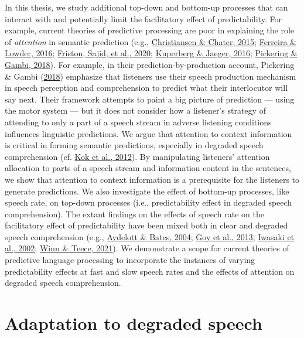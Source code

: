 \documentclass[a4paper, nobind]{templates/ociamthesis}
\begin{document}
In this thesis, we study additional top-down and bottom-up processes that can interact with and potentially limit the facilitatory effect of predictability.
For example, current theories of predictive processing are poor in explaining the role of \emph{attention} in semantic prediction (e.g., \protect\hyperlink{ref-Christiansen2015}{Christiansen \& Chater, 2015}; \protect\hyperlink{ref-Ferreira2016}{Ferreira \& Lowder, 2016}; \protect\hyperlink{ref-Friston2020b}{Friston, Sajid, et al., 2020}; \protect\hyperlink{ref-Kuperberg2016}{Kuperberg \& Jaeger, 2016}; \protect\hyperlink{ref-Pickering2018}{Pickering \& Gambi, 2018}).
For example, in their prediction-by-production account, Pickering \& Gambi (\protect\hyperlink{ref-Pickering2018}{2018}) emphasize that listeners use their speech production mechanism in speech perception and comprehension to predict what their interlocutor will say next.
Their framework attempts to paint a big picture of prediction --- using the motor system ---
but it does not consider how a listener's strategy of attending to only a part of a speech stream in adverse listening conditions influences linguistic predictions.
We argue that attention to context information is critical in forming semantic predictions,
especially in degraded speech comprehension (cf. \protect\hyperlink{ref-Kok2012}{Kok et al., 2012}).
By manipulating listeners' attention allocation to parts of a speech stream and information content in the sentences, we show that attention to context information is a prerequisite for the listeners to generate predictions.
We also investigate the effect of bottom-up processes, like speech rate, on top-down processes (i.e., predictability effect in degraded speech comprehension).
The extant findings on the effects of speech rate on the facilitatory effect of predictability have been mixed both in clear and degraded speech comprehension (e.g., \protect\hyperlink{ref-Aydelott2004}{Aydelott \& Bates, 2004}; \protect\hyperlink{ref-Goy2013}{Goy et al., 2013}; \protect\hyperlink{ref-Iwasaki2002}{Iwasaki et al., 2002}; \protect\hyperlink{ref-Winn2021}{Winn \& Teece, 2021}).
We demonstrate a scope for current theories of predictive language processing to incorporate
the instances of varying predictability effects at fast and slow speech rates and the effects of attention on degraded speech comprehension.

\hypertarget{background-adaptation}{%
\section{Adaptation to degraded speech}\label{background-adaptation}}
\end{document}
